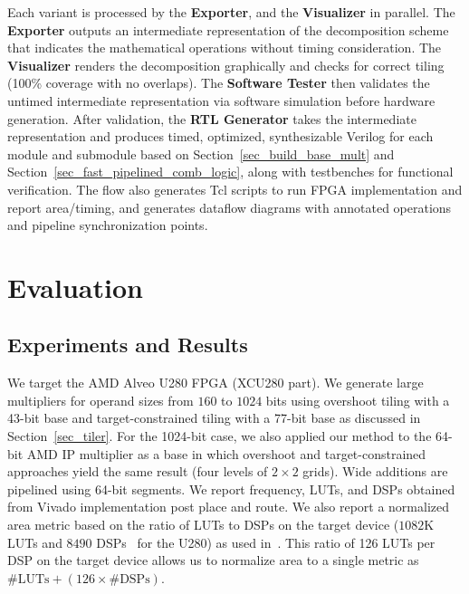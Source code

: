 \documentclass[conference]{IEEEtran}
\begin{document}
Each variant is processed by the \textbf{Exporter}, and the \textbf{Visualizer} in parallel.  
The \textbf{Exporter} outputs an intermediate representation of the decomposition scheme that indicates the mathematical operations without timing consideration.
The \textbf{Visualizer} renders the decomposition graphically and checks for correct tiling (100\% coverage with no overlaps).
The \textbf{Software Tester} then validates the untimed intermediate representation via software simulation before hardware generation.
After validation, the \textbf{RTL Generator} takes the intermediate representation and produces timed, optimized, synthesizable Verilog for each module and submodule based on Section~\ref{sec_build_base_mult} and Section~\ref{sec_fast_pipelined_comb_logic}, along with testbenches for functional verification.
The flow also generates Tcl scripts to run FPGA implementation and report area/timing, and generates dataflow diagrams with annotated operations and pipeline synchronization points.













% 
\section{Evaluation}
\subsection{Experiments and Results}
We target the AMD Alveo U280 FPGA (XCU280 part).
We generate large multipliers for operand sizes from $160$ to $1024$ bits using overshoot tiling with a 43-bit base and target-constrained tiling with a 77-bit base as discussed in Section~\ref{sec_tiler}.
For the 1024-bit case, we also applied our method to the 64-bit AMD IP multiplier as a base in which overshoot and target-constrained approaches yield the same result (four levels of $2\times2$ grids).
Wide additions are pipelined using 64-bit segments.
We report frequency, LUTs, and DSPs obtained from Vivado implementation post place and route.
We also report a normalized area metric based on the ratio of LUTs to DSPs on the target device ($1082$K LUTs and $8490$ DSPs~\cite{U280SwitchingCharacteristics} for the U280) as used in~\cite{fahmyMapDSPMaxPerformance2016,zhangIMpressLargeInteger2022}.
This ratio of 126 LUTs per DSP on the target device allows us to normalize area to a single metric as $\#\text{LUTs} + (126 \times \#\text{DSPs})$.
\end{document}
